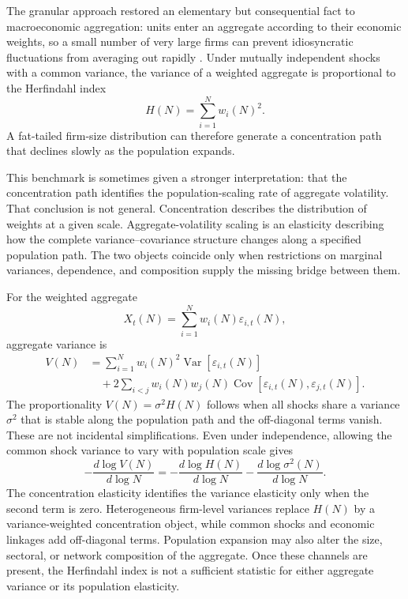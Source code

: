 \documentclass[preprint,12pt,authoryear]{elsarticle}
\begin{document}
The granular approach restored an elementary but consequential fact to
macroeconomic aggregation: units enter an aggregate according to their
economic weights, so a small number of very large firms can prevent
idiosyncratic fluctuations from averaging out rapidly
\citep{gabaix2011}. Under mutually independent shocks with a common
variance, the variance of a weighted aggregate is proportional to the
Herfindahl index
\begin{equation}
    H(N)=\sum_{i=1}^{N}w_i(N)^2.
\end{equation}
A fat-tailed firm-size distribution can therefore generate a
concentration path that declines slowly as the population expands.

This benchmark is sometimes given a stronger interpretation: that the
concentration path identifies the population-scaling rate of aggregate
volatility. That conclusion is not general. Concentration describes the
distribution of weights at a given scale. Aggregate-volatility scaling
is an elasticity describing how the complete variance--covariance
structure changes along a specified population path. The two objects
coincide only when restrictions on marginal variances, dependence, and
composition supply the missing bridge between them.

For the weighted aggregate
\begin{equation}
    X_t(N)=\sum_{i=1}^{N}w_i(N)\varepsilon_{i,t}(N),
\end{equation}
aggregate variance is
\begin{align}
\label{eq:intro_variance}
    V(N)
    &=
    \sum_{i=1}^{N}w_i(N)^2
    \operatorname{Var}\!\left[\varepsilon_{i,t}(N)\right]
    \nonumber\\
    &\quad+
    2\sum_{i<j}w_i(N)w_j(N)
    \operatorname{Cov}\!\left[
        \varepsilon_{i,t}(N),\varepsilon_{j,t}(N)
    \right].
\end{align}
The proportionality $V(N)=\sigma^2H(N)$ follows when all shocks share a
variance $\sigma^2$ that is stable along the population path and the
off-diagonal terms vanish. These are not incidental simplifications.
Even under independence, allowing the common shock variance to vary with
population scale gives
\begin{equation}
\label{eq:benchmark_elasticity_bridge}
    -\frac{d\log V(N)}{d\log N}
    =
    -\frac{d\log H(N)}{d\log N}
    -\frac{d\log \sigma^2(N)}{d\log N}.
\end{equation}
The concentration elasticity identifies the variance elasticity only
when the second term is zero. Heterogeneous firm-level variances replace
$H(N)$ by a variance-weighted concentration object, while common shocks
and economic linkages add off-diagonal terms. Population expansion may
also alter the size, sectoral, or network composition of the aggregate.
Once these channels are present, the Herfindahl index is not a sufficient
statistic for either aggregate variance or its population elasticity.
\end{document}
